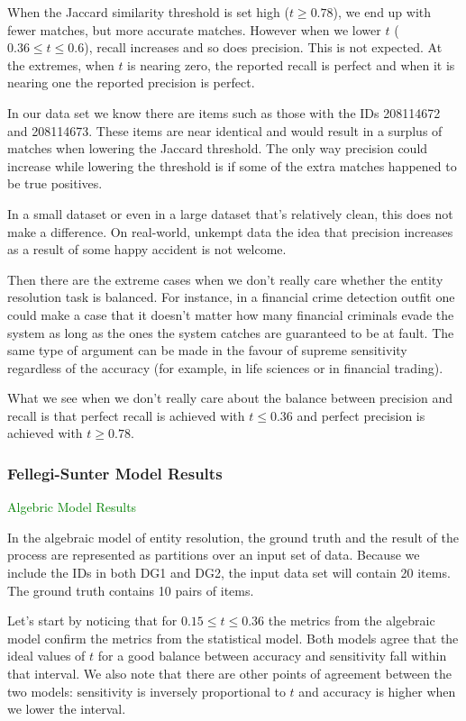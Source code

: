 \documentclass[11pt]{article}
\begin{document}
    When the Jaccard similarity threshold is set high ($t \geq 0.78$), we end up
    with fewer matches, but more accurate matches.
    However when we lower $t$ ($0.36 \leq t \leq 0.6$), recall increases and
    so does precision.
    This is not expected.
    At the extremes, when $t$ is nearing zero, the reported recall is perfect
    and when it is nearing one the reported precision is perfect.
    
    In our data set we know there are items such as those with the IDs
    208114672 and 208114673.
    These items are near identical and would result in a surplus of matches
    when lowering the Jaccard threshold.
    The only way precision could increase while lowering the threshold is if
    some of the extra matches happened to be true positives.

    In a small dataset or even in a large dataset that's relatively clean, this
    does not make a difference.
    On real-world, unkempt data the idea that precision increases as a result of
    some happy accident is not welcome.
    
    Then there are the extreme cases when we don't really care whether the
    entity resolution task is balanced.
    For instance, in a financial crime detection outfit one could make a case
    that it doesn't matter how many financial criminals evade the system as long
    as the ones the system catches are guaranteed to be at fault.
    The same type of argument can be made in the favour of supreme sensitivity
    regardless of the accuracy (for example, in life sciences or in financial
    trading).

    What we see when we don't really care about the balance between precision
    and recall is that perfect recall is achieved with $t \leq 0.36$ and perfect
    precision is achieved with $t \geq 0.78$.

    \subsubsection{Fellegi-Sunter Model Results}
    \textcolor{green}{Algebric Model Results}
    
    In the algebraic model of entity resolution, the ground truth and the result
    of the process are represented as partitions over an input set of data.
    Because we include the IDs in both DG1 and DG2, the input data set will
    contain 20 items.
    The ground truth contains 10 pairs of items.

    Let's start by noticing that for $0.15 \leq t \leq 0.36$ the metrics from
    the algebraic model confirm the metrics from the statistical model.
    Both models agree that the ideal values of $t$ for a good balance between
    accuracy and sensitivity fall within that interval.
    We also note that there are other points of agreement between the two
    models: sensitivity is inversely proportional to $t$ and accuracy is higher
    when we lower the interval.
\end{document}
